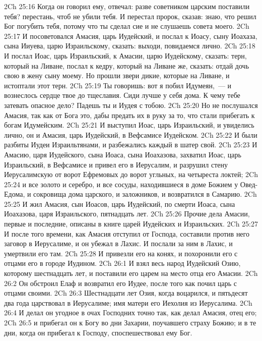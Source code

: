 \vs 2Ch 25:16 Когда он говорил ему,  отвечал: разве советником царским поставили тебя? перестань, чтоб не убили тебя. И перестал пророк, сказав: знаю, что решил Бог погубить тебя, потому что ты сделал сие и не слушаешь совета моего.
\vs 2Ch 25:17 И посоветовался Амасия, царь Иудейский, и послал к Иоасу, сыну Иоахаза, сына Ииуева, царю Израильскому, сказать: выходи, повидаемся лично.
\vs 2Ch 25:18 И послал Иоас, царь Израильский, к Амасии, царю Иудейскому, сказать: терн, который на Ливане, послал к кедру, который на Ливане же, сказать: отдай дочь свою в жену сыну моему. Но прошли звери дикие, которые на Ливане, и истоптали этот терн.
\vs 2Ch 25:19 Ты говоришь: вот я побил Идумеян,~--- и вознеслось сердце твое до тщеславия. Сиди лучше у себя дома. К чему тебе затевать опасное дело? Падешь ты и Иудея с тобою.
\vs 2Ch 25:20 Но не послушался Амасия, так как от Бога  это, дабы предать их в руку  за то, что стали прибегать к богам Идумейским.
\vs 2Ch 25:21 И выступил Иоас, царь Израильский, и увиделись лично, он и Амасия, царь Иудейский, в Вефсамисе Иудейском.
\vs 2Ch 25:22 И были разбиты Иудеи Израильтянами, и разбежались каждый в шатер свой.
\vs 2Ch 25:23 И Амасию, царя Иудейского, сына Иоаса, сына Иоахазова, захватил Иоас, царь Израильский, в Вефсамисе и привел его в Иерусалим, и разрушил стену Иерусалимскую от ворот Ефремовых до ворот угльных, на четыреста локтей;
\vs 2Ch 25:24 и  все золото и серебро, и все сосуды, находившиеся в доме Божием у Овед-Едома, и сокровища дома царского, и заложников, и возвратился в Самарию.
\rsbpar\vs 2Ch 25:25 И жил Амасия, сын Иоасов, царь Иудейский, по смерти Иоаса, сына Иоахазова, царя Израильского, пятнадцать лет.
\vs 2Ch 25:26 Прочие дела Амасии, первые и последние, описаны в книге царей Иудейских и Израильских.
\vs 2Ch 25:27 И после того времени, как Амасия отступил от Господа, составили против него заговор в Иерусалиме, и он убежал в Лахис. И послали за ним в Лахис, и умертвили его там.
\vs 2Ch 25:28 И привезли его на конях, и похоронили его с отцами его в городе Иудином.
\vs 2Ch 26:1 И взял весь народ Иудейский Озию, которому  шестнадцать лет, и поставили его царем на место отца его Амасии.
\vs 2Ch 26:2 Он обстроил Елаф и возвратил его Иудее, после того как почил царь с отцами своими.
\rsbpar\vs 2Ch 26:3 Шестнадцати лет  Озия, когда воцарился, и пятьдесят два года царствовал в Иерусалиме; имя матери его Иехолия из Иерусалима.
\vs 2Ch 26:4 И делал он угодное в очах Господних точно так, как делал Амасия, отец его;
\vs 2Ch 26:5 и прибегал он к Богу во дни Захарии, поучавшего страху Божию; и в те дни, когда он прибегал к Господу, споспешествовал ему Бог.
